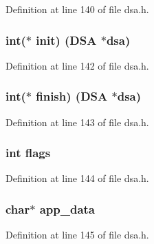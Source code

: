 Definition at line 140 of file dsa.\+h.

\subsubsection[{\texorpdfstring{init}{init}}]{\setlength{\rightskip}{0pt plus 5cm}int($\ast$ init) ({\bf D\+SA} $\ast$dsa)}\hypertarget{structdsa__method_a9be54b09f782278134aac76b2bcd048a}{}\label{structdsa__method_a9be54b09f782278134aac76b2bcd048a}


Definition at line 142 of file dsa.\+h.

\subsubsection[{\texorpdfstring{finish}{finish}}]{\setlength{\rightskip}{0pt plus 5cm}int($\ast$ finish) ({\bf D\+SA} $\ast$dsa)}\hypertarget{structdsa__method_a586412a5baf76cc021b255a7a412a6bd}{}\label{structdsa__method_a586412a5baf76cc021b255a7a412a6bd}


Definition at line 143 of file dsa.\+h.

\subsubsection[{\texorpdfstring{flags}{flags}}]{\setlength{\rightskip}{0pt plus 5cm}int flags}\hypertarget{structdsa__method_ac8bf36fe0577cba66bccda3a6f7e80a4}{}\label{structdsa__method_ac8bf36fe0577cba66bccda3a6f7e80a4}


Definition at line 144 of file dsa.\+h.

\subsubsection[{\texorpdfstring{app\+\_\+data}{app_data}}]{\setlength{\rightskip}{0pt plus 5cm}char$\ast$ app\+\_\+data}\hypertarget{structdsa__method_ae2a89f832bf7b6b967e9c3d590e65f83}{}\label{structdsa__method_ae2a89f832bf7b6b967e9c3d590e65f83}


Definition at line 145 of file dsa.\+h.

